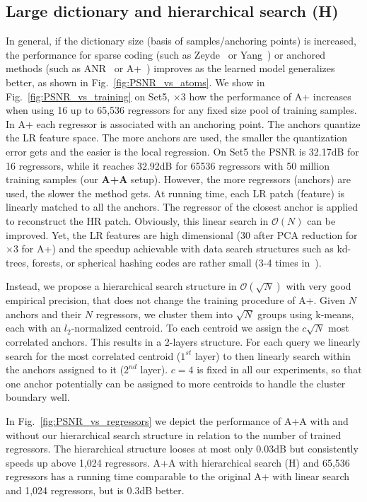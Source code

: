 \documentclass[10pt,twocolumn,letterpaper]{article}
\begin{document}
\subsection{Large dictionary and hierarchical search (H)}
\label{ssc:large}
In general, if the dictionary size (basis of samples/anchoring points) is increased, the performance for sparse coding (such as Zeyde~\cite{Zeyde-CS-2012} or Yang~\cite{Yang-CVPR-2008}) or anchored methods (such as ANR~\cite{Timofte-ICCV-2013} or A+~\cite{Timofte-ACCV-2014}) improves as the learned model generalizes better, as shown in Fig.~\ref{fig:PSNR_vs_atoms}.
We show in Fig.~\ref{fig:PSNR_vs_training} on Set5, $\times3$ how the performance of A+ increases when using 16 up to 65,536 regressors for any fixed size pool of training samples. In A+ each regressor is associated with an anchoring point. The anchors quantize the LR feature space. The more anchors are used, the smaller the quantization error gets and the easier is the local regression. On Set5 the PSNR is 32.17dB for 16 regressors, while it reaches 32.92dB for 65536 regressors with 50 million training samples (our \textbf{A+A} setup). However, the more regressors (anchors) are used, the slower the method gets. At running time, each LR patch (feature) is linearly matched to all the anchors. The regressor of the closest anchor is applied to reconstruct the HR patch. Obviously, this linear search in $\mathcal{O}(N)$ can be improved.
Yet, the LR features are high dimensional (30 after PCA reduction for $\times3$ for A+) and the speedup achievable with data search structures such as kd-trees, forests, or spherical hashing codes are rather small (3-4 times in~\cite{Perez-ACCV-2014,Schulter-CVPR-2015}).

Instead, we propose a hierarchical search structure in $\mathcal{O}(\sqrt{N})$ with very good empirical precision, that does not change the training procedure of A+. Given $N$ anchors and their $N$ regressors, we cluster them into $\sqrt{N}$ groups using k-means, each with an $l_2$-normalized centroid. To each centroid we assign the $c\sqrt{N}$ most correlated anchors. This results in a 2-layers structure. For each query we linearly search for the most correlated centroid ($1^{st}$ layer) to then linearly search within the anchors assigned to it ($2^{nd}$ layer). $c=4$ is fixed in all our experiments, so that one anchor potentially can be assigned to more centroids to handle the cluster boundary well.

In Fig.~\ref{fig:PSNR_vs_regressors} we depict the performance of A+A with and without our hierarchical search structure in relation to the number of trained regressors. The hierarchical structure looses at most only 0.03dB but consistently speeds up above 1,024 regressors. A+A with hierarchical search (H) and 65,536 regressors has a running time comparable to the original A+ with linear search and 1,024 regressors, but is 0.3dB better. 
\end{document}
